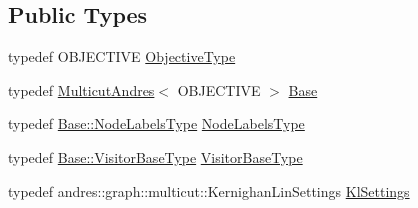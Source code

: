 \subsection*{Public Types}
\begin{DoxyCompactItemize}
\item 
typedef O\+B\+J\+E\+C\+T\+I\+VE \hyperlink{classnifty_1_1graph_1_1opt_1_1multicut_1_1MulticutAndresKernighanLin_a8ddf8ec911eea2346aa0b04455bb2fde}{Objective\+Type}
\item 
typedef \hyperlink{classnifty_1_1graph_1_1opt_1_1multicut_1_1MulticutAndres}{Multicut\+Andres}$<$ O\+B\+J\+E\+C\+T\+I\+VE $>$ \hyperlink{classnifty_1_1graph_1_1opt_1_1multicut_1_1MulticutAndresKernighanLin_ab78f50b4aea673a5906827b7edae099f}{Base}
\item 
typedef \hyperlink{classnifty_1_1graph_1_1opt_1_1multicut_1_1MulticutAndres_a6cd9d64abc4a98aa9745ce1ef0d4ecfe}{Base\+::\+Node\+Labels\+Type} \hyperlink{classnifty_1_1graph_1_1opt_1_1multicut_1_1MulticutAndresKernighanLin_a130051fae5c39b5ff6e52b363b07e70b}{Node\+Labels\+Type}
\item 
typedef \hyperlink{classnifty_1_1graph_1_1opt_1_1multicut_1_1MulticutAndres_a295da342b6ebe8a8720cadd1dcce2e57}{Base\+::\+Visitor\+Base\+Type} \hyperlink{classnifty_1_1graph_1_1opt_1_1multicut_1_1MulticutAndresKernighanLin_a02ab5ea089da407c3a0100510b58d644}{Visitor\+Base\+Type}
\item 
typedef andres\+::graph\+::multicut\+::\+Kernighan\+Lin\+Settings \hyperlink{classnifty_1_1graph_1_1opt_1_1multicut_1_1MulticutAndresKernighanLin_aed67f0394e2e8a7b91440a52ce2a105f}{Kl\+Settings}
\end{DoxyCompactItemize}
